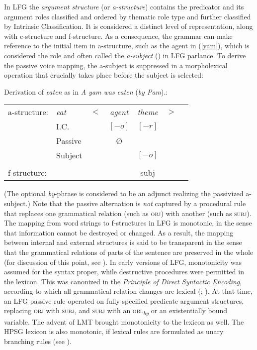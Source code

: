 In LFG the \textit{argument structure} (or \textit{a-structure}) contains the predicator and its argument roles classified and ordered by thematic role type and further classified by  Intrinsic Classification.  It is considered a distinct level of representation, along with c-structure and f-structure.  As a consequence, the grammar can make reference to the initial item in a-structure, such as the agent
in (\ref{yam}), which is considered the  role and often called the \textit{a-subject} () in LFG parlance.  To derive the passive voice mapping, the a-subject is suppressed in a morpholexical operation that crucially takes place before the subject is selected:  

 \begin{exe}
\ex\label{yam2}{Derivation of \textit{eaten} as in \emph{A yam was eaten} (\emph{by Pam}).:\\
\begin{tabular}[t]{@{}lllccll}
a-structure: &{\it eat}& $<$& \textit{agent} & \textit{theme}   & $>$ & \\
             & I.C.      &    & $[-o]$ & $[-r]$   &   & \\
             & Passive      &    & \O  &    &   & \\
             &  Subject     &    &  &       $[-o]$     &              & \\
             &       &    &    & \vline &    & \\
f-structure: &       &    & &{\sc subj} &   &
\end{tabular}
  }
\end{exe}
(The optional \textit{by}-phrase is considered to be an adjunct realizing the passivized a-subject.)  Note that the passive alternation is \textit{not} captured by a procedural rule that replaces one grammatical relation (such as \textsc{obj}) with another (such as \textsc{subj}).   The mapping from word strings to f-structures in LFG is monotonic, in the sense that information cannot be destroyed or changed.  As a result, the mapping between internal and external structures is said to be transparent in the sense that the grammatical relations of parts of the sentence are preserved in the whole (for discussion of this point, see \citealt[Chapter 5]{BATW2016a}).  In early versions of LFG, monotonicity was assumed for the syntax proper, while destructive procedures were permitted in the lexicon.  This was canonized in the \textit{Principle of Direct Syntactic Encoding}, according to which all grammatical relation changes are lexical (\citealt[180]{KB82a-u}; \citealt[77]{BATW2016a}).  At that time, an LFG passive rule operated on fully specified predicate argument structures, replacing \textsc{obj} with \textsc{subj}, and \textsc{subj} with an \textsc{obl}\textsubscript{\emph{by}} or an existentially bound variable.  The advent of LMT brought monotonicity to the lexicon as well.  The HPSG lexicon is also monotonic, if lexical rules are formulated as unary branching rules (see ). 


